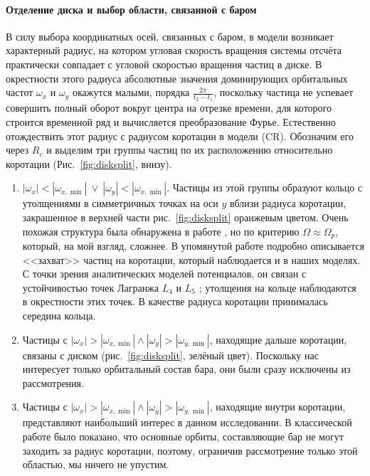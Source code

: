 \documentclass[tikz]{trlnotes}
\begin{document}
\paragraph{Отделение диска и выбор области, связанной с баром}

В силу выбора координатных осей, связанных с баром, в модели возникает характерный радиус, на котором угловая скорость вращения системы отсчёта практически совпадает с угловой скоростью вращения частиц в диске.
В окрестности этого радиуса абсолютные значения доминирующих
орбитальных частот $\omega_x$ и $\omega_y$ окажутся малыми, порядка $\frac{2\pi}{t_2 - t_1}$, поскольку частица не успевает совершить полный оборот вокруг центра на отрезке времени, для которого строится временной ряд и вычисляется преобразование Фурье. Естественно отождествить этот радиус с радиусом
коротации в модели (CR). Обозначим его через $R_c$ и выделим три группы частиц по их расположению относительно коротации
(Рис.~\ref{fig:disksplit}, внизу).
\begin{enumerate}
  \item $|ω_x| < |ω_{x, \min}| \:\lor\: |ω_y| < |ω_{x, \min}|$.
Частицы из этой группы образуют кольцо с утолщениями в
симметричных точках на оси $y$ вблизи радиуса коротации, закрашенное в верхней части рис.~\ref{fig:disksplit}
оранжевым цветом.
Очень похожая структура была обнаружена в работе \citet{ceverino2007}, но по критерию $Ω \approx Ω_p$, который, на мой взгляд, сложнее. В упомянутой работе подробно описывается <<захват>> частиц на коротации, который
наблюдается и в наших моделях. С точки зрения аналитических моделей потенциалов, он связан с устойчивостью
точек Лагранжа $L_4$ и $L_5$ \citep[Fig.~3.14]{2008gady.book.....B}; утолщения на кольце наблюдаются в окрестности этих точек.
В качестве радиуса коротации принималась середина кольца.  
\item Частицы с $|ω_x| > |ω_{x, \min}| \land |ω_y| > |ω_{y, \min}|$, находящие дальше коротации, связаны с диском
(рис.~\ref{fig:disksplit}, зелёный цвет). Поскольку нас интересует только орбитальный состав бара, они были сразу исключены из рассмотрения. 
\item Частицы с $|ω_x| > |ω_{x, \min}| \land |ω_y| > |ω_{y, \min}|$,
  находящие внутри коротации, представляют наибольший интерес в данном
  исследовании. В классической работе \citet{contopoulos1980} было
  показано, что основные орбиты, составляющие
бар не могут заходить за радиус коротации, поэтому, ограничив рассмотрение только этой областью, мы ничего не
упустим.
\end{enumerate}
\end{document}
